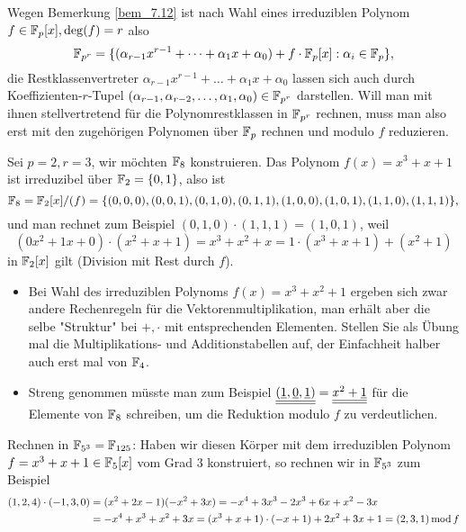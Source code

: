 \begin{bem}
	Wegen Bemerkung \ref{bem_7.12} ist nach Wahl eines irreduziblen Polynom $f \in \mathbb{F}_p[x], \deg(f) = r$ also
	\[\mathbb{F}_{p^r} = \{ (\alpha_{r-1} x^{r-1} + \dots + \alpha_1 x + \alpha_0) + f \cdot \mathbb{F}_p[x] : \alpha_i \in \mathbb{F}_p\},\]
	die Restklassenvertreter $\alpha_{r-1} x^{r-1} + \dots + \alpha_1 x + \alpha_0$ lassen sich auch durch Koeffizienten-$r$-Tupel $(\alpha_{r-1}, \alpha_{r-2}, \dots, \alpha_1, \alpha_0) \in \mathbb{F}_{p^r}$ darstellen. Will man mit ihnen stellvertretend für die Polynomrestklassen in $\mathbb{F}_{p^r}$ rechnen, muss man also erst mit den zugehörigen Polynomen über $\mathbb{F}_p$ rechnen und modulo $f$ reduzieren.
\end{bem}

\begin{bsp}
	Sei $p = 2, r=3$, wir möchten $\mathbb{F}_8$ konstruieren. Das Polynom $f(x) = x^3 + x + 1$ ist irreduzibel über $\mathbb{F}_2 = \{0,1\}$, also ist 
	\[ \mathbb{F}_8 = \mathbb{F}_2[x]/(f) = \{ (0,0,0), (0,0,1), (0,1,0), (0,1,1), (1,0,0), (1,0,1), (1,1,0), (1,1,1)\}, \]
	und man rechnet zum Beispiel $(0,1,0) \cdot (1,1,1) = (1,0,1)$, weil
	\[ (0x^2 + 1x + 0) \cdot (x^2 + x + 1) = x^3 + x^2 + x = 1 \cdot (x^3 + x + 1) + (x^2 + 1) \]
	in $\mathbb{F}_2[x]$ gilt (Division mit Rest durch $f$). \begin{itemize}
	\item Bei Wahl des irreduziblen Polynoms $f(x) = x^3 + x^2 + 1$ ergeben sich zwar andere Rechenregeln für die Vektorenmultiplikation, man erhält aber die selbe "Struktur" bei $+,\cdot$ mit entsprechenden Elementen. Stellen Sie als Übung mal die Multiplikations- und Additionstabellen auf, der Einfachheit halber auch erst mal von $\mathbb{F}_4$.
	\item Streng genommen müsste man zum Beispiel $\uline{\uline{(\uline{1}, \uline{0}, \uline{1})}} = \uline{\uline{x^2 + \uline{1}}}$ für die Elemente von $\mathbb{F}_8$ schreiben, um die Reduktion modulo $f$ zu verdeutlichen.
	\end{itemize}
\end{bsp}

\begin{bsp}
	Rechnen in $\mathbb{F}_{5^3} = \mathbb{F}_{125}$: Haben wir diesen Körper mit dem irreduziblen Polynom $f = x^3 + x + 1 \in \mathbb{F}_5[x]$ vom Grad $3$ konstruiert, so rechnen wir in $\mathbb{F}_{5^3}$ zum Beispiel
	\begin{equation}
	\begin{aligned}
		(1,2,4) \cdot (-1,3,0) &= (x^2 + 2x - 1)(-x^2 + 3x) = -x^4 + 3x^3 - 2x^3 + 6x + x^2 -3x \\
		&= -x^4 + x^3 + x^2 + 3x = (x^3+x+1) \cdot (-x+1) + 2x^2+3x+1 = (2,3,1) \operatorname{mod} f
	\end{aligned}
	\end{equation}
\end{bsp}


